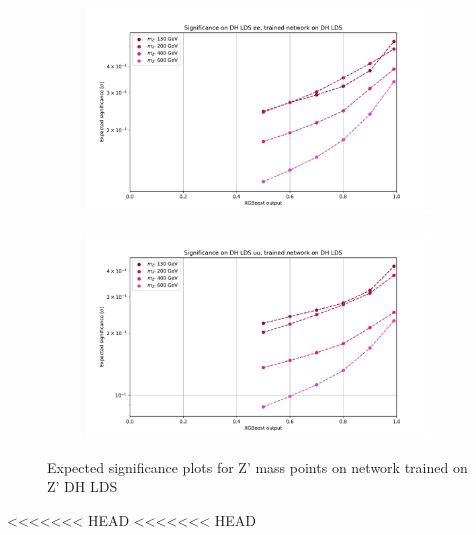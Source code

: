 \documentclass[12pt, a4paper]{book}
\begin{document}
\begin{figure}[!ht]
	\centering
	\begin{subfigure}[b]{0.49\textwidth}
      \centering
      \includegraphics[width=1\textwidth]{XGBoost/DH_LDS/EXP_SIG_ee.pdf}
      \end{subfigure}
   \hfill
   \begin{subfigure}[b]{0.49\textwidth}
      \centering
      \includegraphics[width=1\textwidth]{XGBoost/DH_LDS/EXP_SIG_uu.pdf}
      \end{subfigure}
   \caption{Expected significance plots for Z' mass points on network trained on Z' DH LDS}\label{fig:DH_LDS_exp_sig}
\end{figure}
<<<<<<< HEAD
<<<<<<< HEAD
\end{document}

